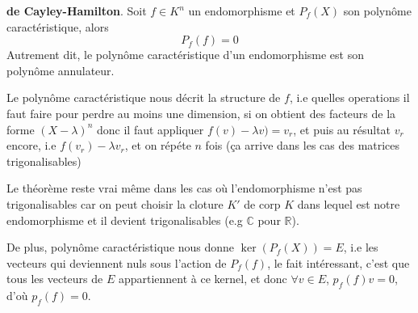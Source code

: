 \begin{theorem}\label{thm:cayley-hamilton} \textbf{de Cayley-Hamilton}. Soit $f \in K^n$ un endomorphisme et $P_f(X)$ son polynôme caractéristique, alors
     \[
    P_f(f) = 0
    \] 
    Autrement dit, le polynôme caractéristique d'un endomorphisme est son polynôme annulateur.
\end{theorem}
\begin{intuition}
   Le polynôme caractéristique nous décrit la structure de $f$, i.e quelles operations il faut faire pour perdre au moins une dimension, si on obtient des facteurs de la forme $(X - \lambda)^n$ donc il faut appliquer  $f(v) - \lambda v) = v_r$, et puis au résultat $v_r$ encore, i.e  $f(v_r) - \lambda v_r$, et on répéte  $n$ fois (ça arrive dans les cas des matrices trigonalisables) 

   Le théorème reste vrai même dans les cas où l'endomorphisme n'est pas trigonalisables car on peut choisir la cloture $K'$ de corp  $K$ dans lequel est notre endomorphisme et il devient trigonalisables (e.g $\mathbb{C}$ pour  $\mathbb{R}$).

   De plus, polynôme caractéristique nous donne  $\ker(P_f(X)) = E$, i.e les vecteurs qui deviennent nuls sous l'action de  $P_f(f)$, le fait intéressant, c'est que tous les vecteurs de  $E$ appartiennent à ce kernel, et donc  $\forall v \in E$, $p_f(f)v = 0$, d'où  $p_f(f) = 0$.
\end{intuition}

